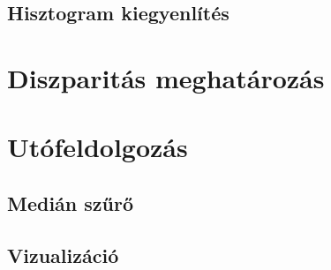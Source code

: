 \subsection{Hisztogram kiegyenlítés}\label{sect:histNorm}


\section{Diszparitás meghatározás}\label{sect:Depthproc}

\section{Utófeldolgozás}\label{sect:Postproc}


\subsection{Medián szűrő}\label{sect:median}


\subsection{Vizualizáció}\label{sect:visual}

